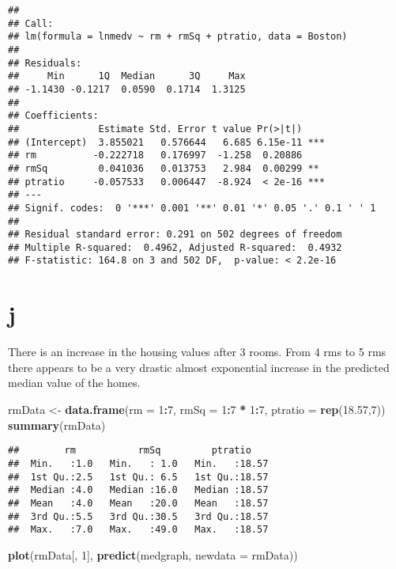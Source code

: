 \documentclass[]{article}
\newenvironment{Shaded}{\begin{snugshade}}{\end{snugshade}}
\newcommand{\KeywordTok}[1]{\textcolor[rgb]{0.13,0.29,0.53}{\textbf{#1}}}
\newcommand{\DataTypeTok}[1]{\textcolor[rgb]{0.13,0.29,0.53}{#1}}
\newcommand{\DecValTok}[1]{\textcolor[rgb]{0.00,0.00,0.81}{#1}}
\newcommand{\FloatTok}[1]{\textcolor[rgb]{0.00,0.00,0.81}{#1}}
\newcommand{\StringTok}[1]{\textcolor[rgb]{0.31,0.60,0.02}{#1}}
\newcommand{\OperatorTok}[1]{\textcolor[rgb]{0.81,0.36,0.00}{\textbf{#1}}}
\newcommand{\NormalTok}[1]{#1}
\begin{document}
\begin{verbatim}
## 
## Call:
## lm(formula = lnmedv ~ rm + rmSq + ptratio, data = Boston)
## 
## Residuals:
##     Min      1Q  Median      3Q     Max 
## -1.1430 -0.1217  0.0590  0.1714  1.3125 
## 
## Coefficients:
##              Estimate Std. Error t value Pr(>|t|)    
## (Intercept)  3.855021   0.576644   6.685 6.15e-11 ***
## rm          -0.222718   0.176997  -1.258  0.20886    
## rmSq         0.041036   0.013753   2.984  0.00299 ** 
## ptratio     -0.057533   0.006447  -8.924  < 2e-16 ***
## ---
## Signif. codes:  0 '***' 0.001 '**' 0.01 '*' 0.05 '.' 0.1 ' ' 1
## 
## Residual standard error: 0.291 on 502 degrees of freedom
## Multiple R-squared:  0.4962, Adjusted R-squared:  0.4932 
## F-statistic: 164.8 on 3 and 502 DF,  p-value: < 2.2e-16
\end{verbatim}

\section{j}\label{j}

There is an increase in the housing values after 3 rooms. From 4 rms to
5 rms there appears to be a very drastic almost exponential increase in
the predicted median value of the homes.

\begin{Shaded}
\begin{Highlighting}[]
\NormalTok{rmData <-}\StringTok{ }\KeywordTok{data.frame}\NormalTok{(}\DataTypeTok{rm =} \DecValTok{1}\OperatorTok{:}\DecValTok{7}\NormalTok{, }\DataTypeTok{rmSq =} \DecValTok{1}\OperatorTok{:}\DecValTok{7} \OperatorTok{*}\StringTok{ }\DecValTok{1}\OperatorTok{:}\DecValTok{7}\NormalTok{, }\DataTypeTok{ptratio =} \KeywordTok{rep}\NormalTok{(}\FloatTok{18.57}\NormalTok{,}\DecValTok{7}\NormalTok{))}
\KeywordTok{summary}\NormalTok{(rmData)}
\end{Highlighting}
\end{Shaded}

\begin{verbatim}
##        rm           rmSq         ptratio     
##  Min.   :1.0   Min.   : 1.0   Min.   :18.57  
##  1st Qu.:2.5   1st Qu.: 6.5   1st Qu.:18.57  
##  Median :4.0   Median :16.0   Median :18.57  
##  Mean   :4.0   Mean   :20.0   Mean   :18.57  
##  3rd Qu.:5.5   3rd Qu.:30.5   3rd Qu.:18.57  
##  Max.   :7.0   Max.   :49.0   Max.   :18.57
\end{verbatim}

\begin{Shaded}
\begin{Highlighting}[]
\KeywordTok{plot}\NormalTok{(rmData[, }\DecValTok{1}\NormalTok{], }\KeywordTok{predict}\NormalTok{(medgraph, }\DataTypeTok{newdata =}\NormalTok{ rmData))}
\end{Highlighting}
\end{Shaded}
\end{document}
